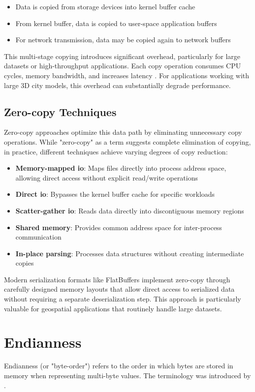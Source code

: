 \begin{itemize}
  \item Data is copied from storage devices into kernel buffer cache
  \item From kernel buffer, data is copied to user-space application buffers
  \item For network transmission, data may be copied again to network buffers
\end{itemize}

This multi-stage copying introduces significant overhead, particularly for large datasets or high-throughput applications. Each copy operation consumes CPU cycles, memory bandwidth, and increases latency \citep{song2012performance}. For applications working with large 3D city models, this overhead can substantially degrade performance.

\subsection{Zero-copy Techniques}
\label{tb:zero_copy_techniques}
Zero-copy approaches optimize this data path by eliminating unnecessary copy operations. While "zero-copy" as a term suggests complete elimination of copying, in practice, different techniques achieve varying degrees of copy reduction:

\begin{itemize}
  \item \textbf{Memory-mapped \ac{io}}: Maps files directly into process address space, allowing direct access without explicit read/write operations
  \item \textbf{Direct \ac{io}}: Bypasses the kernel buffer cache for specific workloads
  \item \textbf{Scatter-gather \ac{io}}: Reads data directly into discontiguous memory regions
  \item \textbf{Shared memory}: Provides common address space for inter-process communication
  \item \textbf{In-place parsing}: Processes data structures without creating intermediate copies
\end{itemize}

Modern serialization formats like FlatBuffers implement zero-copy through carefully designed memory layouts that allow direct access to serialized data without requiring a separate deserialization step. This approach is particularly valuable for geospatial applications that routinely handle large datasets.
\section{Endianness}
\label{tb:endianness}
Endianness (or "byte-order") refers to the order in which bytes are stored in memory when representing multi-byte values. The terminology was introduced by \citet{danny_cohen_1981}.

